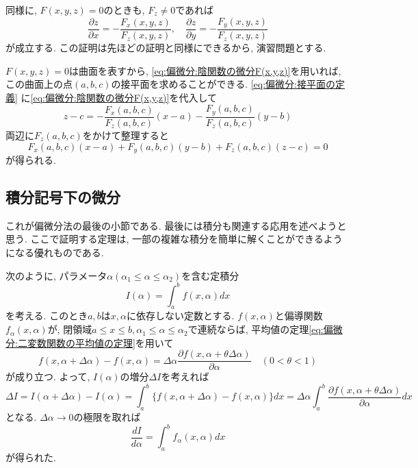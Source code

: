         同様に, $F(x,y,z)=0$のときも, $F_z\neq 0$であれば
        \begin{equation}
            \frac{\partial z}{\partial x} = -\frac{F_{x}(x,y,z)}{F_z(x,y,z)},\quad \frac{\partial z}{\partial y}=-\frac{F_{y}(x,y,z)}{F_{z}(x,y,z)} \label{eq:偏微分:陰関数の微分F(x,y,z)}
        \end{equation}
        が成立する. この証明は先ほどの証明と同様にできるから, 演習問題とする.

        $F(x,y,z)=0$は曲面を表すから, \eqref{eq:偏微分:陰関数の微分F(x,y,z)}を用いれば, この曲面上の点$(a,b,c)$の接平面を求めることができる. \eqref{eq:偏微分:接平面の定義} に\eqref{eq:偏微分:陰関数の微分F(x,y,z)}を代入して
        \begin{equation*}
            z-c=-\frac{F_x(a,b,c)}{F_z(a,b,c)}(x-a)-\frac{F_y(a,b,c)}{F_z(a,b,c)}(y-b)
        \end{equation*}
        両辺に$F_z(a,b,c)$をかけて整理すると
        \begin{equation}
            F_x(a,b,c)(x-a)+F_y(a,b,c)(y-b)+F_z(a,b,c)(z-c)=0 \label{eq:偏微分:陰関数の接平面}
        \end{equation}
        が得られる.
    \clearpage
    \subsection{積分記号下の微分}
        これが偏微分法の最後の小節である. 最後には積分も関連する応用を述べようと思う. ここで証明する定理は, 一部の複雑な積分を簡単に解くことができるようになる優れものである.

        次のように, パラメータ$\alpha (\alpha_1\leq \alpha\leq \alpha_2)$を含む定積分
        \begin{equation}
            I(\alpha)=\int_a^b f(x,\alpha)dx
        \end{equation}
        を考える. このとき$a,b$は$x,\alpha$に依存しない定数とする. $f(x,\alpha)$と偏導関数$f_\alpha(x,\alpha)$が, 閉領域$a\leq x\leq b,\alpha_1\leq \alpha\leq \alpha_2$で連続ならば, 
        平均値の定理\eqref{eq:偏微分:二変数関数の平均値の定理}を用いて
        \begin{equation*}
            f(x,\alpha+\Delta\alpha)-f(x,\alpha)=\Delta\alpha\frac{\partial f(x,\alpha+\theta\Delta\alpha)}{\partial\alpha} \quad (0<\theta<1)
        \end{equation*}
        が成り立つ. よって, $I(\alpha)$の増分$\Delta I$を考えれば
        \begin{equation*}
            \Delta I=I(\alpha+\Delta\alpha)-I(\alpha)=\int_{a}^{b}\{f(x,\alpha+\Delta\alpha)-f(x,\alpha)\}dx=\Delta\alpha\int_{a}^{b}\frac{\partial f(x,\alpha+\theta\Delta\alpha)}{\partial\alpha}dx
        \end{equation*}
        となる. $\Delta\alpha\to 0$の極限を取れば
        \begin{equation}
            \frac{dI}{d\alpha}=\int_{a}^{b} f_{\alpha}(x,\alpha)dx \label{eq:偏微分:積分記号下の微分}
        \end{equation}
        が得られた.\\

